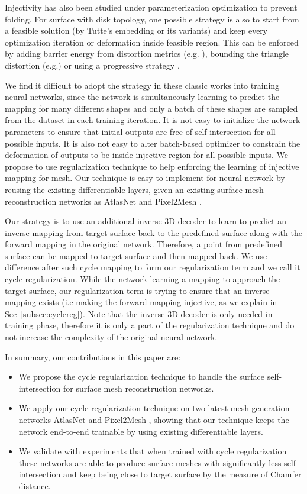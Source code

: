 Injectivity has also been studied under parameterization optimization to prevent folding. For surface with disk topology, one possible strategy is also to start from a feasible solution (by Tutte's embedding \cite{tutte} or its variants) and keep every optimization iteration or deformation inside feasible region. This can be enforced by adding barrier energy from distortion metrics (e.g. \cite{provableplanarmapping,lifted_bijection}), bounding the triangle distortion (e.g.\cite{freeboundary,boundeddistortion})
or using a progressive strategy \cite{Liu_PP_2018}. 

We find it difficult to adopt the strategy in these classic works into training neural networks, since the network is simultaneously learning to predict the mapping for many different shapes and only a batch of these shapes are sampled from the dataset in each training iteration. It is not easy to initialize the network parameters to ensure that initial outputs are free of self-intersection for all possible inputs. It is also not easy to alter batch-based optimizer to constrain the deformation of outputs to be inside injective region for all possible inputs. We propose to use regularization technique to help enforcing the learning of injective mapping for mesh. Our technique is easy to implement for neural network by reusing the existing differentiable layers, given an existing surface mesh reconstruction networks as AtlasNet \cite{atlasnet} and Pixel2Mesh \cite{pixel2mesh}.

 Our strategy is to use an additional inverse 3D decoder to learn to predict an inverse mapping from target surface back to the predefined surface along with the forward mapping in the original network. Therefore, a point from predefined surface can be mapped to target surface and then mapped back. We use difference after such cycle mapping to form our regularization term and we call it cycle regularization. While the network learning a mapping to approach the target surface, our regularization term is trying to ensure that an inverse mapping exists (i.e making the forward mapping injective, as we explain in Sec~\ref{subsec:cyclereg}).
Note that the inverse 3D decoder is only needed in training phase, therefore it is only a part of the regularization technique and do not increase the complexity of the original neural network.

In summary, our contributions in this paper are:
\begin{itemize}
	\item We propose the cycle regularization technique to handle the surface self-intersection for surface mesh reconstruction networks. 
	\item We apply our cycle regularization technique on two latest mesh generation networks AtlasNet \cite{atlasnet} and Pixel2Mesh \cite{pixel2mesh}, showing that our technique keeps the network end-to-end trainable by using existing differentiable layers.
	\item We validate with experiments that when trained with cycle regularization these networks are able to produce surface meshes with significantly less self-intersection and keep being close to target surface by the measure of Chamfer distance.
\end{itemize}

 